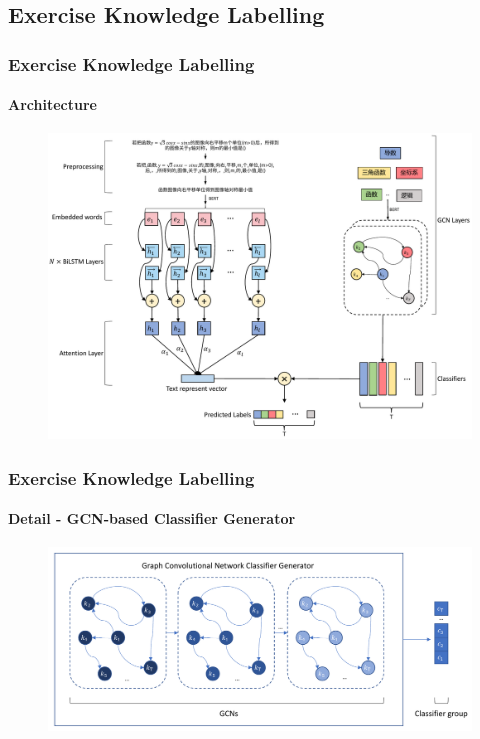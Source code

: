 \documentclass{beamer}
\begin{document}
\subsection{Exercise Knowledge Labelling}
\begin{frame}
  \frametitle{Exercise Knowledge Labelling}
  \framesubtitle{Architecture}
  \begin{figure}
    \centering
    \includegraphics[height=0.80\textheight]{figures/ch2-ov.pdf}
  \end{figure}
\end{frame}

\begin{frame}
  \frametitle{Exercise Knowledge Labelling}
  \framesubtitle{Detail - GCN-based Classifier Generator}
  \begin{figure}
    \centering
    \includegraphics[width=1.0\textwidth]{figures/ch2-gcnclsgen-model.pdf}
  \end{figure}
\end{frame}
\end{document}
